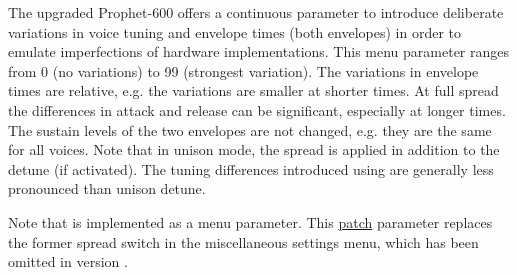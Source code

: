 The upgraded Prophet-600 offers a continuous parameter to introduce deliberate variations in voice tuning and envelope times (both envelopes) in  order to emulate imperfections of hardware implementations. This menu parameter \vintage ranges from 0 (no variations) to 99 (strongest variation). The variations in envelope times are relative, e.g. the variations are smaller at shorter times. At full spread the differences in attack and release can be significant, especially at longer times. The sustain levels of the two envelopes are not changed, e.g. they are the same for all voices. Note that in unison mode, the spread is applied in addition to the detune (if activated). The tuning differences introduced using \vintage are generally less pronounced than unison detune.

Note that \vintage is implemented as a menu parameter. This \underline{patch} parameter replaces the former spread switch in the miscellaneous settings menu, which has been omitted in version \version.
